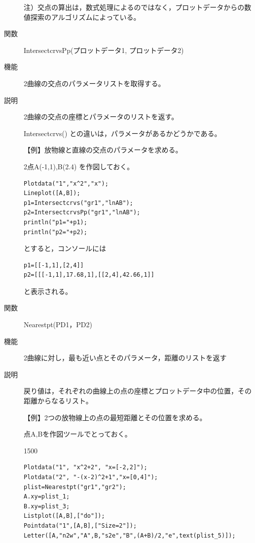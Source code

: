 \documentclass[papersize,a4paper,12pt,uplatex]{jsarticle}
\begin{document}
\begin{description}
\vspace{\baselineskip}
注）交点の算出は，数式処理によるのではなく，プロットデータからの数値探索のアルゴリズムによっている。

\vspace{\baselineskip}
\hypertarget{intersectcrvspp}{}
\item[関数]IntersectcrvsPp(プロットデータ1, プロットデータ2)
\item[機能]2曲線の交点のパラメータリストを取得する。
\item[説明]2曲線の交点の座標とパラメータのリストを返す。

Intersectcrvs() との違いは，パラメータがあるかどうかである。

\vspace{\baselineskip}
【例】放物線と直線の交点のパラメータを求める。

2点A(-1,1),B(2.4) を作図しておく。
\begin{verbatim}
Plotdata("1","x^2","x");
Lineplot([A,B]);
p1=Intersectcrvs("gr1","lnAB");
p2=IntersectcrvsPp("gr1","lnAB");
println("p1="+p1);
println("p2="+p2);
\end{verbatim}
とすると，コンソールには
\begin{verbatim}
p1=[[-1,1],[2,4]] 
p2=[[[-1,1],17.68,1],[[2,4],42.66,1]]
\end{verbatim}
と表示される。

\vspace{\baselineskip}
\hypertarget{nearestpt}{}
\item[関数]Nearestpt(PD1，PD2)
\item[機能]2曲線に対し，最も近い点とそのパラメータ，距離のリストを返す
\item[説明]戻り値は，それぞれの曲線上の点の座標とプロットデータ中の位置，その距離からなるリスト。

\vspace{\baselineskip}
【例】2つの放物線上の点の最短距離とその位置を求める。

点A,Bを作図ツールでとっておく。

\begin{layer}{150}{0}
\end{layer}

\begin{verbatim}
Plotdata("1", "x^2+2", "x=[-2,2]");
Plotdata("2", "-(x-2)^2+1","x=[0,4]");
plist=Nearestpt("gr1","gr2");
A.xy=plist_1;
B.xy=plist_3;
Listplot([A,B],["do"]);
Pointdata("1",[A,B],["Size=2"]);
Letter([A,"n2w","A",B,"s2e","B",(A+B)/2,"e",text(plist_5)]);
\end{verbatim}


\end{description}
\end{document}
